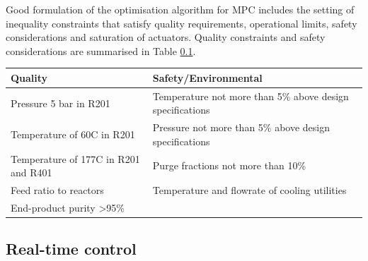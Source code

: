 Good formulation of the optimisation algorithm for MPC includes the setting of inequality constraints that satisfy quality requirements, operational limits, safety considerations and saturation of actuators. Quality constraints and safety considerations are summarised in Table \ref{}.

\begin{table}[]
\begin{tabular}{@{}ll@{}}
\toprule
\textbf{Quality}                      & \textbf{Safety/Environmental}                             \\ \midrule
Pressure 5 bar in R201                & Temperature not more than 5\% above design specifications \\
Temperature of 60C in R201            & Pressure not more than 5\% above design specifications    \\
Temperature of 177C in R201 and R401  & Purge fractions not more than 10\%                        \\
Feed ratio to reactors                & Temperature and flowrate of cooling utilities             \\
End-product purity \textgreater{}95\% &                                                           \\ \bottomrule
\end{tabular}
\end{table}

\subsection{Real-time control}
